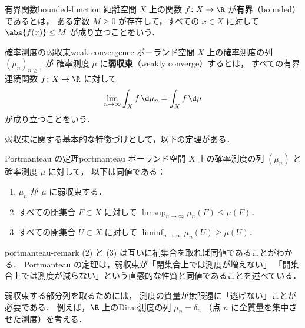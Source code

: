 \begin{definition}{有界関数}{bounded-function}
  距離空間 $X$ 上の関数 $f \colon X \to \R$ が\textbf{有界}（bounded）であるとは，
  ある定数 $M \geq 0$ が存在して，すべての $x \in X$ に対して $\abs{f(x)} \leq M$
  が成り立つことをいう．
\end{definition}

\begin{definition}{確率測度の弱収束}{weak-convergence}
  ポーランド空間 $X$ 上の確率測度の列 $(\mu_n)_{n \geq 1}$ が
  確率測度 $\mu$ に\textbf{弱収束}（weakly converge）するとは，
  すべての有界連続関数 $f \colon X \to \R$ に対して
  \[
    \lim_{n \to \infty} \int_X f \, \d\mu_n = \int_X f \, \d\mu
  \]
  が成り立つことをいう．
\end{definition}

弱収束に関する基本的な特徴づけとして，以下の定理がある．

\begin{theorem}{Portmanteau の定理}{portmanteau}
  ポーランド空間 $X$ 上の確率測度の列 $(\mu_n)$ と確率測度 $\mu$ に対して，
  以下は同値である：
  \begin{enumerate}
    \item $\mu_n$ が $\mu$ に弱収束する．
    \item すべての閉集合 $F \subset X$ に対して
      $\limsup_{n \to \infty} \mu_n(F) \leq \mu(F)$．
    \item すべての開集合 $U \subset X$ に対して
      $\liminf_{n \to \infty} \mu_n(U) \geq \mu(U)$．
  \end{enumerate}
\end{theorem}

\begin{remark}{}{portmanteau-remark}
  (2) と (3) は互いに補集合を取れば同値であることがわかる．
  Portmanteau の定理は，弱収束が「閉集合上では測度が増えない」
  「開集合上では測度が減らない」という直感的な性質と同値であることを述べている．
\end{remark}

弱収束する部分列を取るためには，
測度の質量が無限遠に「逃げない」ことが必要である．
例えば，$\R$ 上のDirac測度の列 $\mu_n = \delta_n$
（点 $n$ に全質量を集中させた測度）を考える．

